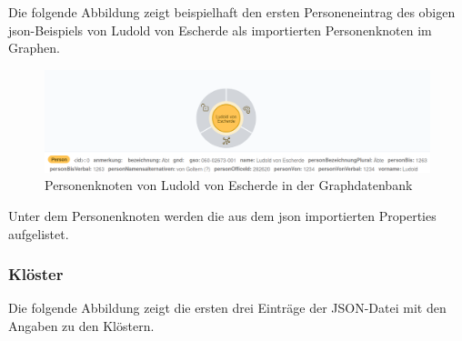 Die folgende Abbildung zeigt beispielhaft den ersten Personeneintrag des
obigen json-Beispiels von Ludold von Escherde als importierten
Personenknoten im Graphen.

\begin{figure}
\centering
\includegraphics{Bilder/Germania-Sacra-Personenknoten-mit-Properties.png}
\caption{Personenknoten von Ludold von Escherde in der Graphdatenbank}
\end{figure}

Unter dem Personenknoten werden die aus dem json importierten Properties
aufgelistet.

\hypertarget{kluxf6ster}{%
\subsubsection{Klöster}\label{kluxf6ster}}

Die folgende Abbildung zeigt die ersten drei Einträge der JSON-Datei mit
den Angaben zu den Klöstern.

